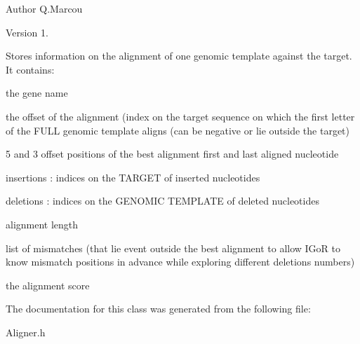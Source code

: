 \begin{DoxyAuthor}{Author}
Q.\+Marcou 
\end{DoxyAuthor}
\begin{DoxyVersion}{Version}
1.
\end{DoxyVersion}
Stores information on the alignment of one genomic template against the target. It contains\+:
\begin{DoxyItemize}
\item the gene name
\item the offset of the alignment (index on the target sequence on which the first letter of the F\+U\+LL genomic template aligns (can be negative or lie outside the target)
\item 5\textquotesingle{} and 3\textquotesingle{} offset positions of the best alignment first and last aligned nucleotide
\item insertions \+: indices on the T\+A\+R\+G\+ET of inserted nucleotides
\item deletions \+: indices on the G\+E\+N\+O\+M\+IC T\+E\+M\+P\+L\+A\+TE of deleted nucleotides
\item alignment length
\item list of mismatches (that lie event outside the best alignment to allow I\+GoR to know mismatch positions in advance while exploring different deletions numbers)
\item the alignment score 
\end{DoxyItemize}

The documentation for this class was generated from the following file\+:\begin{DoxyCompactItemize}
\item 
Aligner.\+h\end{DoxyCompactItemize}
